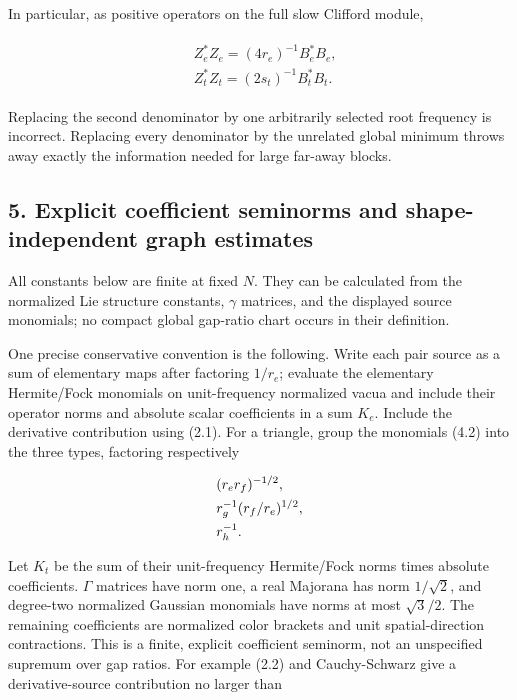 In particular, as positive operators on the full slow Clifford module,

\begin{gather*}
\begin{aligned}
& Z_{e}^{*} Z_{e} = (4r_{e})^{-1} B_{e}^{*}B_{e}, \\
& Z_{t}^{*} Z_{t} = (2s_{t})^{-1} B_{t}^{*}B_{t}.
\end{aligned}\tag{4.5}
\end{gather*}

Replacing the second denominator by one arbitrarily selected root
frequency is incorrect. Replacing every denominator by the unrelated
global minimum throws away exactly the information needed for large
far-away blocks.

\subsection{5. Explicit coefficient seminorms and shape-independent
graph
estimates}\label{c-explicit-coefficient-seminorms-and-shape-independent-graph-estimates}

All constants below are finite at fixed \(N\). They can be calculated
from the normalized Lie structure constants, \(\gamma\) matrices, and
the displayed source monomials; no compact global gap-ratio chart occurs
in their definition.

One precise conservative convention is the following. Write each pair
source as a sum of elementary maps after factoring \(1/r_{e}\); evaluate
the elementary Hermite/Fock monomials on unit-frequency normalized vacua
and include their operator norms and absolute scalar coefficients in a
sum \(K_{e}\). Include the derivative contribution using (2.1). For a
triangle, group the monomials (4.2) into the three types, factoring
respectively

\begin{gather*}
\begin{aligned}
& (r_{e} r_{f})^{-1/2}, \\
& r_{g}^{-1} (r_{f}/r_{e})^{1/2}, \\
& r_{h}^{-1}.
\end{aligned}\notag
\end{gather*}

Let \(K_{t}\) be the sum of their unit-frequency Hermite/Fock norms
times absolute coefficients. \(\Gamma\) matrices have norm one, a real
Majorana has norm \(1/\sqrt{2}\), and degree-two normalized Gaussian
monomials have norms at most \(\sqrt{3}/2\). The remaining coefficients
are normalized color brackets and unit spatial-direction contractions.
This is a finite, explicit coefficient seminorm, not an unspecified
supremum over gap ratios. For example (2.2) and Cauchy-Schwarz give a
derivative-source contribution no larger than

